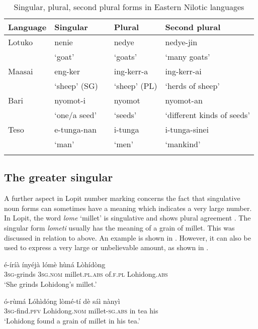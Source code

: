 \documentclass[output=paper]{langsci/langscibook}
\begin{document}
\begin{table}
\begin{tabularx}{\textwidth}{llp{1cm}lX}
\lsptoprule

 {Language} & {Singular} &  & {Plural} & {Second plural}\\ \midrule
Lotuko &  nenie &  &  nedye &  nedye-jin\\
& ‘goat’ &  & ‘goats’ & ‘many goats’\\
\tablevspace
Maasai &  eng-ker &  &  ing-kerr-a &  ing-kerr-ai\\
& ‘sheep’ (SG) &  & ‘sheep’ (PL) & ‘herds of sheep’\\
\tablevspace
Bari &  nyomot-i &  &  nyomot &  nyomot-an\\
& ‘one/a seed’ &  & ‘seeds’ & ‘different kinds of seeds’\\
\tablevspace
Teso &  e-tunga-nan &  &  i-tunga &  i-tunga-sinei\\
& ‘man’ &  & ‘men’ & ‘mankind’\\
\lspbottomrule
\end{tabularx}
\caption{Singular, plural, second plural forms in Eastern Nilotic languages}
\label{tab:moodie:18}
\end{table}

\subsection{The greater singular}\label{sec:moodie:5.2}

A further aspect in Lopit number marking concerns the fact that singulative noun forms can sometimes have a meaning which indicates a very large number. In Lopit, the word \textit{lome} ‘millet’ is singulative and shows plural agreement . The singular form \textit{lometi} usually has the meaning of a grain of millet. This was discussed in relation to  above. An example is shown in . However, it can also be used to express a very large or unbelievable amount, as shown in .

\ea\label{ex:moodie:8}
\gll é-íríà ínyéjà lómè hùná Lòhídòng \\
3\textsc{sg}-grinds 3\textsc{sg.nom} millet.\textsc{pl.abs} of.\textsc{f.pl} Lohidong.\textsc{abs} \\
\glt ‘She grinds Lohidong’s millet.’
\z

\ea\label{ex:moodie:9}
\gll ó-rùmá Lóhìdóng lòmé-tí dè sáì nànyì  \\
3\textsc{sg}-find.\textsc{pfv} Lohidong.\textsc{nom} millet-\textsc{sg.abs} in tea his \\
\glt ‘Lohidong found a grain of millet in his tea.’
\z
\end{document}
